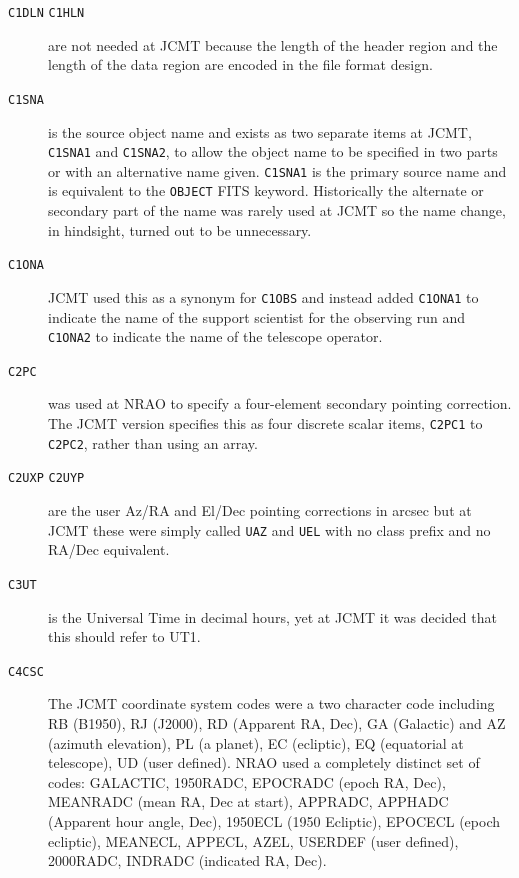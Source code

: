 \documentclass[final,authoryear,5p,times,twocolumn]{elsarticle}
\begin{document}
\begin{description}

\item[\texttt{C1DLN} \texttt{C1HLN}] are not needed at JCMT
  because the length of the header region and the length of the data
  region are encoded in the file format design.

\item[\texttt{C1SNA}] is the source object name and exists as two separate
  items at JCMT, \texttt{C1SNA1} and \texttt{C1SNA2}, to allow the
  object name to be specified in two parts or with an alternative name
  given. \texttt{C1SNA1} is the primary source name and is equivalent
  to the \texttt{OBJECT} FITS keyword. Historically the alternate or
  secondary part of the name was rarely used at JCMT so the name
  change, in hindsight, turned out to be unnecessary.

\item[\texttt{C1ONA}] JCMT used this as a synonym for \texttt{C1OBS}
  and instead added \texttt{C1ONA1} to indicate the name of the
  support scientist for the observing run and \texttt{C1ONA2} to
  indicate the name of the telescope operator.

\item[\texttt{C2PC}] was used at NRAO to specify a four-element
  secondary pointing correction. The JCMT version specifies this as
  four discrete scalar items, \texttt{C2PC1} to \texttt{C2PC2}, rather
  than using an array.

\item[\texttt{C2UXP} \texttt{C2UYP}] are the user Az/RA and El/Dec
  pointing corrections in arcsec but at JCMT these were simply called
  \texttt{UAZ} and \texttt{UEL} with no class prefix and no RA/Dec
  equivalent.

\item[\texttt{C3UT}] is the Universal Time in decimal hours, yet at
  JCMT it was decided that this should refer to UT1.

\item[\texttt{C4CSC}] The JCMT coordinate system codes \citep{mtdn12}
  were a two character code including RB (B1950), RJ (J2000), RD
  (Apparent RA, Dec), GA (Galactic) and AZ (azimuth elevation), PL (a
  planet), EC (ecliptic), EQ (equatorial at telescope), UD (user
  defined). NRAO used a completely distinct set of codes: GALACTIC,
  1950RADC, EPOCRADC (epoch RA, Dec), MEANRADC (mean RA, Dec at
  start), APPRADC, APPHADC (Apparent hour angle, Dec), 1950ECL (1950
  Ecliptic), EPOCECL (epoch ecliptic), MEANECL, APPECL, AZEL, USERDEF
  (user defined), 2000RADC, INDRADC (indicated RA, Dec).


\end{description}
\end{document}
